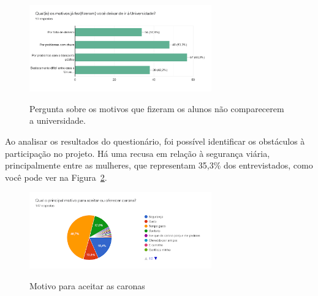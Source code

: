 \begin{figure}[H]
	\centering
	\caption{Pergunta sobre os motivos que fizeram os alunos não comparecerem a universidade.}
	\includegraphics[width=0.7\textwidth]{./04-figuras/questionario/1.png}
	\label{fig:dadosmeiodetransporte}
\end{figure}





Ao analisar os resultados do questionário, foi possível identificar os obstáculos à participação no projeto. Há uma recusa em relação à segurança viária, principalmente entre as mulheres, que representam 35,3\% dos entrevistados, como você pode ver na Figura~\ref{fig:aceitacaopelascaronas}.

\begin{figure}[H]
	\centering
	\caption{Motivo para aceitar as caronas}
	\includegraphics[width=0.7\textwidth]{./04-figuras/questionario/3.png}
	\label{fig:aceitacaopelascaronas}
\end{figure}


